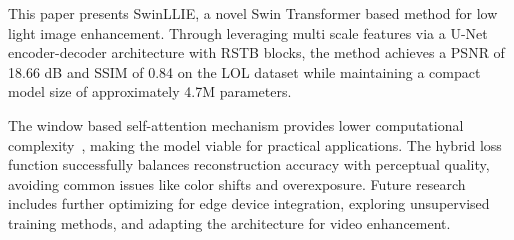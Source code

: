 \documentclass[sigconf]{acmart}
\begin{document}
This paper presents SwinLLIE, a novel Swin Transformer based method for low light image enhancement. Through leveraging multi scale features via a U-Net encoder-decoder architecture with RSTB blocks, the method achieves a PSNR of 18.66 dB and SSIM of 0.84 on the LOL dataset while maintaining a compact model size of approximately 4.7M parameters. 

The window based self-attention mechanism provides lower computational complexity~\cite{liu2021swin}, making the model viable for practical applications. The hybrid loss function successfully balances reconstruction accuracy with perceptual quality, avoiding common issues like color shifts and overexposure. Future research includes further optimizing for edge device integration, exploring unsupervised training methods, and adapting the architecture for video enhancement.
\end{document}
